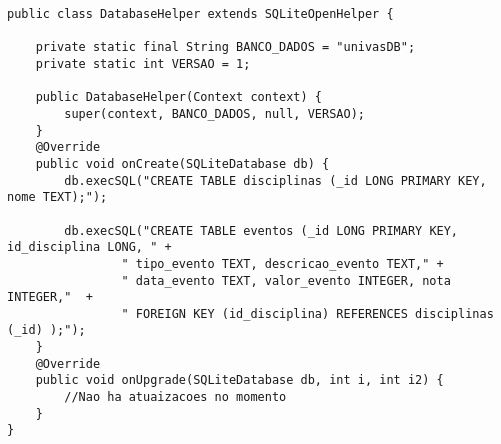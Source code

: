 \begin{lstlisting}[style=custom_JAVA]
public class DatabaseHelper extends SQLiteOpenHelper {

    private static final String BANCO_DADOS = "univasDB";
    private static int VERSAO = 1;

    public DatabaseHelper(Context context) {
        super(context, BANCO_DADOS, null, VERSAO);
    }
    @Override
    public void onCreate(SQLiteDatabase db) {
        db.execSQL("CREATE TABLE disciplinas (_id LONG PRIMARY KEY, nome TEXT);");

        db.execSQL("CREATE TABLE eventos (_id LONG PRIMARY KEY, id_disciplina LONG, " +
                " tipo_evento TEXT, descricao_evento TEXT," +
                " data_evento TEXT, valor_evento INTEGER, nota INTEGER,"  +
                " FOREIGN KEY (id_disciplina) REFERENCES disciplinas (_id) );");
    }
    @Override
    public void onUpgrade(SQLiteDatabase db, int i, int i2) {
        //Nao ha atuaizacoes no momento
    }
}
\end{lstlisting}